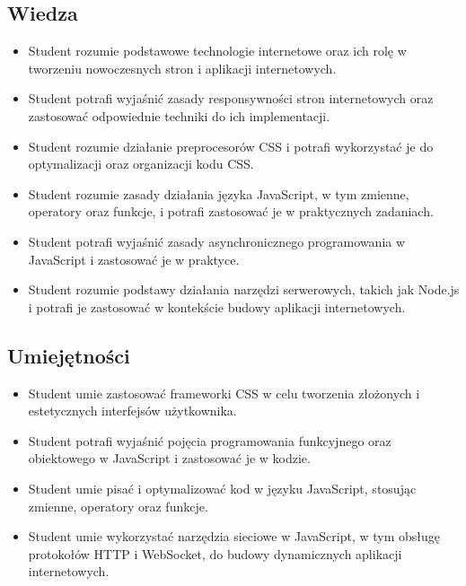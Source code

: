 \documentclass[12pt, a4paper]{article}
\begin{document}
\subsection*{Wiedza}
\begin{itemize}
  \item Student rozumie podstawowe technologie internetowe oraz ich rolę w tworzeniu nowoczesnych stron i aplikacji internetowych.
  \item Student potrafi wyjaśnić zasady responsywności stron internetowych oraz zastosować odpowiednie techniki do ich implementacji.
  \item Student rozumie działanie preprocesorów CSS i potrafi wykorzystać je do optymalizacji oraz organizacji kodu CSS.
  \item Student rozumie zasady działania języka JavaScript, w tym zmienne, operatory oraz funkcje, i potrafi zastosować je w praktycznych zadaniach.
  \item Student potrafi wyjaśnić zasady asynchronicznego programowania w JavaScript i zastosować je w praktyce.
  \item Student rozumie podstawy działania narzędzi serwerowych, takich jak Node.js i potrafi je zastosować w kontekście budowy aplikacji internetowych.
\end{itemize}

\subsection*{Umiejętności}
\begin{itemize}
  \item Student umie zastosować frameworki CSS w celu tworzenia złożonych i estetycznych interfejsów użytkownika.
  \item Student potrafi wyjaśnić pojęcia programowania funkcyjnego oraz obiektowego w JavaScript i zastosować je w kodzie.
  \item Student umie pisać i optymalizować kod w języku JavaScript, stosując zmienne, operatory oraz funkcje.
  \item Student umie wykorzystać narzędzia sieciowe w JavaScript, w tym obsługę protokołów HTTP i WebSocket, do budowy dynamicznych aplikacji internetowych.
\end{itemize}
\end{document}
